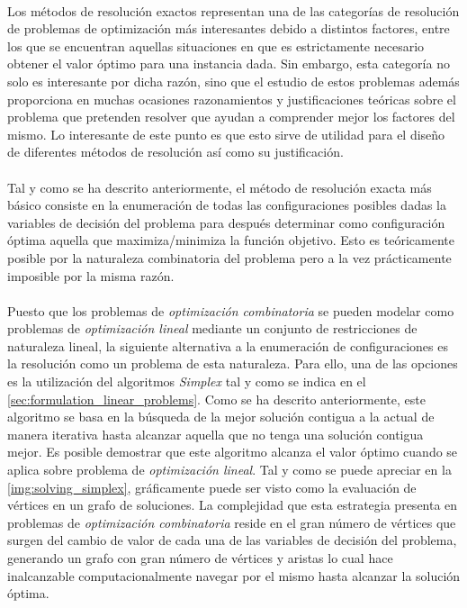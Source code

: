 \documentclass{subfiles}
\begin{document}
      \paragraph{}
      Los métodos de resolución exactos representan una de las categorías de resolución de problemas de optimización más interesantes debido a distintos factores, entre los que se encuentran aquellas situaciones en que es estrictamente necesario obtener el valor óptimo para una instancia dada. Sin embargo, esta categoría no solo es interesante por dicha razón, sino que el estudio de estos problemas además proporciona en muchas ocasiones razonamientos y justificaciones teóricas sobre el problema que pretenden resolver que ayudan a comprender mejor los factores del mismo. Lo interesante de este punto es que esto sirve de utilidad para el diseño de diferentes métodos de resolución así como su justificación.

      \paragraph{}
      Tal y como se ha descrito anteriormente, el método de resolución exacta más básico consiste en la enumeración de todas las configuraciones posibles dadas la variables de decisión del problema para después determinar como configuración óptima aquella que maximiza/minimiza la función objetivo. Esto es teóricamente posible por la naturaleza combinatoria del problema pero a la vez prácticamente imposible por la misma razón.

      \paragraph{}
      Puesto que los problemas de \emph{optimización combinatoria} se pueden modelar como problemas de \emph{optimización lineal} mediante un conjunto de restricciones de naturaleza lineal, la siguiente alternativa a la enumeración de configuraciones es la resolución como un problema de esta naturaleza. Para ello, una de las opciones es la utilización del algoritmos \emph{Simplex} \cite{klee1970good} tal y como se indica en el \cref{sec:formulation_linear_problems}. Como se ha descrito anteriormente, este algoritmo se basa en la búsqueda de la mejor solución contigua a la actual de manera iterativa hasta alcanzar aquella que no tenga una solución contigua mejor. Es posible demostrar que este algoritmo  alcanza el valor óptimo cuando se aplica sobre problema de \emph{optimización lineal}. Tal y como se puede apreciar en la \cref{img:solving_simplex}, gráficamente puede ser visto como la evaluación de vértices en un grafo de soluciones. La complejidad que esta estrategia presenta en problemas de \emph{optimización combinatoria} reside en el gran número de vértices que surgen del cambio de valor de cada una de las variables de decisión del problema, generando un grafo con gran número de vértices y aristas lo cual hace inalcanzable computacionalmente navegar por el mismo hasta alcanzar la solución óptima.
\end{document}
